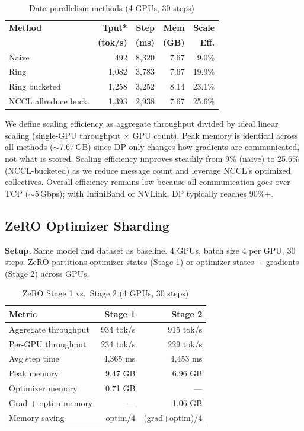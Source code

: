 \documentclass[conference]{IEEEtran}
\begin{document}
\begin{table}[h]
\centering
\caption{Data parallelism methods (4 GPUs, 30 steps)}
\label{tab:dp}
\small
\begin{tabular}{lrrrr}
\toprule
\textbf{Method} & \textbf{Tput*} & \textbf{Step} & \textbf{Mem} & \textbf{Scale} \\
 & \textbf{(tok/s)} & \textbf{(ms)} & \textbf{(GB)} & \textbf{Eff.} \\
\midrule
Naive & 492 & 8,320 & 7.67 & 9.0\% \\
Ring & 1,082 & 3,783 & 7.67 & 19.9\% \\
Ring bucketed & 1,258 & 3,252 & 8.14 & 23.1\% \\
NCCL allreduce buck. & 1,393 & 2,938 & 7.67 & 25.6\% \\
\bottomrule
\end{tabular}
\end{table}

We define scaling efficiency as aggregate throughput divided by ideal linear scaling (single-GPU throughput $\times$ GPU count). Peak memory is identical across all methods ($\sim$7.67\,GB) since DP only changes how gradients are communicated, not what is stored. Scaling efficiency improves steadily from 9\% (naive) to 25.6\% (NCCL-bucketed) as we reduce message count and leverage NCCL's optimized collectives. Overall efficiency remains low because all communication goes over TCP ($\sim$5\,Gbps); with InfiniBand or NVLink, DP typically reaches 90\%+.

\subsection{ZeRO Optimizer Sharding}

\textbf{Setup.} Same model and dataset as baseline. 4 GPUs, batch size 4 per GPU, 30 steps. ZeRO partitions optimizer states (Stage 1) or optimizer states + gradients (Stage 2) across GPUs.

\begin{table}[h]
\centering
\caption{ZeRO Stage 1 vs.\ Stage 2 (4 GPUs, 30 steps)}
\label{tab:zero}
\begin{tabular}{lrr}
\toprule
\textbf{Metric} & \textbf{Stage 1} & \textbf{Stage 2} \\
\midrule
Aggregate throughput & 934 tok/s & 915 tok/s \\
Per-GPU throughput & 234 tok/s & 229 tok/s \\
Avg step time & 4,365 ms & 4,453 ms \\
Peak memory & 9.47 GB & 6.96 GB \\
Optimizer memory & 0.71 GB & --- \\
Grad + optim memory & --- & 1.06 GB \\
Memory saving & optim/4& (grad+optim)/4 \\
\bottomrule
\end{tabular}
\end{table}
\end{document}

